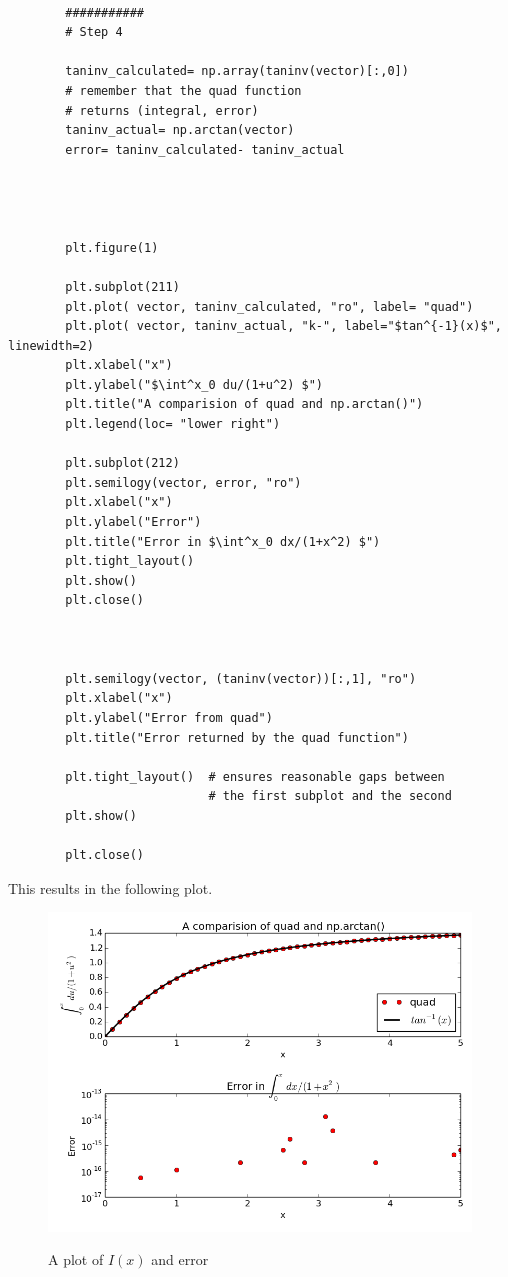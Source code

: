 \documentclass[a4paper, 12pt, margin= 1.25cm ]{article}
\begin{document}
\begin{enumerate}
		\begin{lstlisting}

		###########
		# Step 4

		taninv_calculated= np.array(taninv(vector)[:,0])	
		# remember that the quad function 
		# returns (integral, error)
		taninv_actual= np.arctan(vector)
		error= taninv_calculated- taninv_actual




		plt.figure(1)

		plt.subplot(211)
		plt.plot( vector, taninv_calculated, "ro", label= "quad")
		plt.plot( vector, taninv_actual, "k-", label="$tan^{-1}(x)$", linewidth=2)
		plt.xlabel("x")
		plt.ylabel("$\int^x_0 du/(1+u^2) $")
		plt.title("A comparision of quad and np.arctan()")
		plt.legend(loc= "lower right")

		plt.subplot(212)
		plt.semilogy(vector, error, "ro")
		plt.xlabel("x")
		plt.ylabel("Error")
		plt.title("Error in $\int^x_0 dx/(1+x^2) $")
		plt.tight_layout()
		plt.show()
		plt.close()



		plt.semilogy(vector, (taninv(vector))[:,1], "ro")
		plt.xlabel("x")
		plt.ylabel("Error from quad")
		plt.title("Error returned by the quad function")

		plt.tight_layout()	# ensures reasonable gaps between 
							# the first subplot and the second				
		plt.show()

		plt.close()

		\end{lstlisting}

		This results in the following plot.

		\begin{figure}[h!]
		\includegraphics[width= \linewidth]{figure1.png}
		\label{fig:figure1}
		\caption{A plot of $I(x)$ and error}
		\end{figure} 


\end{enumerate}
\end{document}
